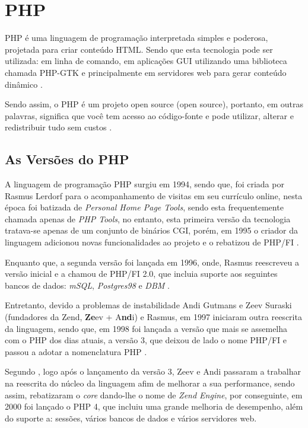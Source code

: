 \section{PHP}

\acs{PHP} é uma linguagem de programação interpretada simples e poderosa,
projetada para criar conteúdo \acs{HTML}. Sendo que esta tecnologia pode ser
utilizada: em linha de comando, em aplicações \ac{GUI} utilizando uma biblioteca
chamada \acs{PHP-GTK} e principalmente em servidores web para gerar conteúdo
dinâmico \cite{programmingPhp}.

Sendo assim, o \acs{PHP} é um projeto \acs{open source} (\acl{open source}),
portanto, em outras palavras, significa que você tem acesso ao código-fonte e
pode utilizar, alterar e redistribuir tudo sem custos \cite{phpAndMysqlWebDevelopment}.

\subsection{As Versões do PHP}

A linguagem de programação \acs{PHP} surgiu em 1994, sendo que, foi criada por
Rasmus Lerdorf para o acompanhamento de visitas em seu currículo online, nesta
época foi batizada de \textit{Personal Home Page Tools}, sendo esta
frequentemente chamada apenas de \textit{PHP Tools}, no entanto, esta primeira
versão da tecnologia tratava-se apenas de um conjunto de binários \ac{CGI},
porém, em 1995 o criador da linguagem adicionou novas funcionalidades ao projeto
e o rebatizou de \ac{PHP/FI} \cite{phpProgramandoComOrientacaoAObjetos}.

Enquanto que, a segunda versão foi lançada em 1996, onde, 
Rasmus reescreveu a versão inicial e a chamou de \acs{PHP/FI} 2.0, que incluia 
suporte aos seguintes bancos de dados: \textit{mSQL},
\textit{Postgres98} e \textit{DBM} \cite{programmingPhp}.

Entretanto, devido a problemas de instabilidade Andi Gutmans e Zeev
Suraski (fundadores da Zend, \textbf{Ze}ev + A\textbf{nd}i) e Rasmus, em 1997
iniciaram outra reescrita da linguagem, sendo que, em 1998 foi lançada a versão
que mais se assemelha com o \acs{PHP} dos dias atuais, a versão 3, que deixou
de lado o nome \acs{PHP/FI} e passou a adotar a nomenclatura \ac{PHP}
\cite{websitePHPHistoria}.

Segundo , logo após o lançamento
da versão 3, Zeev e Andi passaram a trabalhar na reescrita do núcleo da 
linguagem afim de melhorar a sua performance, sendo assim, rebatizaram o
\textit{core} dando-lhe o nome de \textit{Zend Engine}, por conseguinte, em
2000 foi lançado o \acs{PHP} 4, que incluiu uma grande melhoria de desempenho, 
além do suporte a: sessões, vários bancos de dados e vários servidores web.

